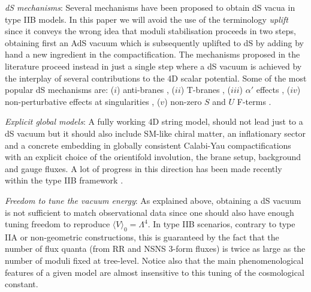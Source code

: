 \documentclass[11pt,a4paper]{article}
\begin{document}
\item \emph{dS mechanisms}: Several mechanisms have been proposed to obtain dS vacua in type IIB models. In this paper we will avoid the use of the terminology \emph{uplift} since it conveys the wrong idea that moduli stabilisation proceeds in two steps, obtaining first an AdS vacuum which is subsequently uplifted to dS by adding by hand a new ingredient in the compactification. The mechanisms proposed in the literature proceed instead in just a single step where a dS vacuum is achieved by the interplay of several contributions to the 4D scalar potential. Some of the most popular dS mechanisms are: ($i$) anti-branes \cite{Kachru:2003aw}, ($ii$) T-branes \cite{Cicoli:2015ylx}, ($iii$) $\alpha'$ effects \cite{Westphal:2006tn}, ($iv$) non-perturbative effects at singularities \cite{Cicoli:2012fh}, ($v$) non-zero $S$ and $U$ F-terms \cite{Gallego:2017dvd}. 

\item \emph{Explicit global models}: A fully working 4D string model, should not lead just to a dS vacuum but it should also include SM-like chiral matter, an inflationary sector and a concrete embedding in globally consistent Calabi-Yau compactifications with an explicit choice of the orientifold involution, the brane setup, background and gauge fluxes. A lot of progress in this direction has been made recently within the type IIB framework \cite{Cicoli:2011qg, Cicoli:2012vw, Cicoli:2013mpa, Cicoli:2013cha, Cicoli:2016xae, Cicoli:2017shd, Cicoli:2017axo}.

\item \emph{Freedom to tune the vacuum energy}: As explained above, obtaining a dS vacuum is not sufficient to match observational data since one should also have enough tuning freedom to reproduce $\langle V\rangle_0 = \Lambda^4$. In type IIB scenarios, contrary to type IIA or non-geometric constructions, this is guaranteed by the fact that the number of flux quanta (from RR and NSNS 3-form fluxes) is twice as large as the number of moduli fixed at tree-level. Notice also that the main phenomenological features of a given model are almost insensitive to this tuning of the cosmological constant. 
\end{document}
